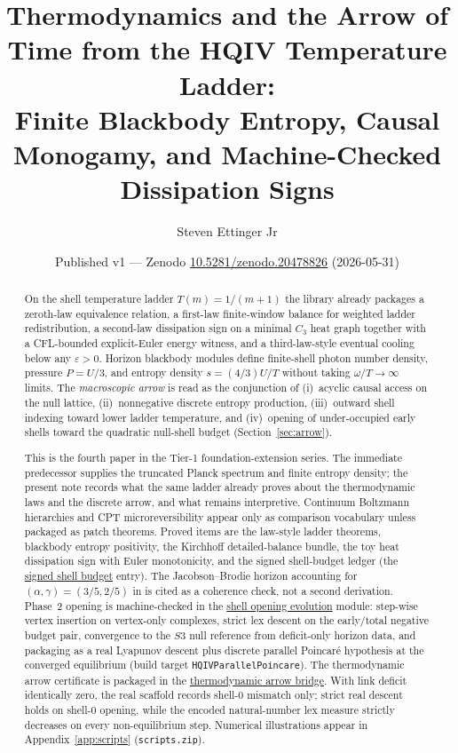 \documentclass[11pt]{amsart}
\title[Thermodynamics and the arrow of time]{Thermodynamics and the Arrow of Time from the HQIV Temperature Ladder:\\
Finite Blackbody Entropy, Causal Monogamy, and Machine-Checked Dissipation Signs}
\author{Steven Ettinger Jr}
\date{Published v1 --- Zenodo \href{https://doi.org/10.5281/zenodo.20478826}{10.5281/zenodo.20478826} (2026-05-31)}
\begin{document}
\begin{abstract}
On the shell temperature ladder $T(m)=1/(m+1)$ the library already packages a
zeroth-law equivalence relation, a first-law finite-window balance for weighted
ladder redistribution, a second-law dissipation sign on a minimal $C_3$ heat graph
together with a CFL-bounded explicit-Euler energy witness, and a third-law-style
eventual cooling below any $\varepsilon>0$. Horizon blackbody modules define
finite-shell photon number density, pressure $P=U/3$, and entropy density
$s=(4/3)U/T$ without taking $\omega/T\to\infty$ limits. The \emph{macroscopic arrow}
is read as the conjunction of (i)~acyclic causal access on the null lattice,
(ii)~nonnegative discrete entropy production, (iii)~outward shell indexing toward
lower ladder temperature, and (iv)~opening of under-occupied early shells toward
the quadratic null-shell budget (Section~\ref{sec:arrow}).

This is the fourth paper in the Tier-1 foundation-extension series. The immediate
predecessor \cite{hqiv-kirchhoff-paper} supplies the truncated Planck spectrum and
finite entropy density; the present note records what the same ladder already proves
about the thermodynamic laws and the discrete arrow, and what remains interpretive.
Continuum Boltzmann hierarchies and CPT microreversibility appear only as comparison
vocabulary unless packaged as patch theorems. Proved items are the law-style ladder
theorems, blackbody entropy positivity, the Kirchhoff detailed-balance bundle, the
toy heat dissipation sign with Euler monotonicity, and the signed shell-budget ledger
(the \hyperref[lean:signed-shell-budget]{signed shell budget} entry).
The Jacobson--Brodie horizon
accounting for $(\alpha,\gamma)=(3/5,2/5)$ in \cite{hqiv-3d-growth-paper} is cited as
a coherence check, not a second derivation. Phase~2 opening is machine-checked in
the \hyperref[lean:shell-opening]{shell opening evolution} module:
step-wise vertex insertion on vertex-only complexes, strict lex descent on the
early/total negative budget pair, convergence to the $S3$ null reference from
deficit-only horizon data, and packaging as a real Lyapunov descent plus
discrete parallel Poincar\'e hypothesis at the converged equilibrium
(build target \texttt{HQIVParallelPoincare}).
The thermodynamic arrow certificate is packaged in the
\hyperref[lean:thermo-arrow-opening]{thermodynamic arrow bridge}.
With link deficit identically zero, the real scaffold records shell-0 mismatch only;
strict real descent holds on shell-0 opening, while the encoded natural-number lex
measure strictly decreases on every non-equilibrium step.
Numerical illustrations appear in Appendix~\ref{app:scripts} (\texttt{scripts.zip}).

\end{abstract}
\maketitle
\end{document}
